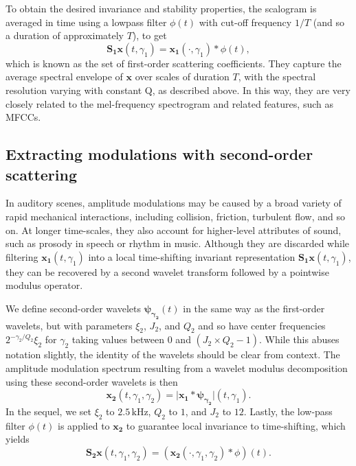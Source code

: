 \documentclass[journal]{IEEEtran}
\begin{document}
To obtain the desired invariance and stability properties, the scalogram is averaged in time using a lowpass filter $\phi(t)$ with cut-off frequency $1/T$ (and so a duration of approximately $T$), to get
\begin{equation}
\mathbf{S_1}\boldsymbol{x}(t, \gamma_1) = \boldsymbol{x_1}(\cdot, \gamma_1) \ast \phi(t),
\end{equation}
which is known as the set of first-order scattering coefficients. They capture the average spectral envelope of $\boldsymbol{x}$ over scales of duration $T$, with the spectral resolution varying with constant Q, as described above. In this way, they are very closely related to the mel-frequency spectrogram and related features, such as MFCCs.

\subsection{Extracting modulations with second-order scattering}
In auditory scenes, amplitude modulations may be caused by a broad variety of rapid mechanical interactions, including collision, friction, turbulent flow, and so on.
At longer time-scales, they also account for higher-level attributes of sound, such as prosody in speech or rhythm in music.
Although they are discarded while filtering $\boldsymbol{x_1}(t,\gamma_1)$ into a local time-shifting invariant representation $\mathbf{S_1}\boldsymbol{x}(t,\gamma_1)$, they can be recovered by a second wavelet transform followed by a pointwise modulus operator.

We define second-order wavelets $\boldsymbol{\psi_{\gamma_2}}(t)$ in the same way as the first-order wavelets, but with parameters $\xi_2$, $J_2$, and $Q_2$ and so have center frequencies $2^{-\gamma_2/Q_2}\xi_2$ for $\gamma_2$ taking values between $0$ and $(J_2 \times Q_2 - 1)$. While this abuses notation slightly, the identity of the wavelets should be clear from context.
The amplitude modulation spectrum resulting from a wavelet modulus decomposition using these second-order wavelets is then
\begin{equation}
\boldsymbol{x_2}(t,\gamma_1,\gamma_2) =
\vert \boldsymbol{x_1} \ast \boldsymbol{\psi_{\gamma_2}} \vert(t,\gamma_1).
\end{equation}
In the sequel, we set $\xi_2$ to $2.5\,\mathrm{kHz}$, $Q_2$ to $1$, and $J_2$ to $12$. Lastly, the low-pass filter $\phi(t)$ is applied to $\boldsymbol{x_2}$ to guarantee local invariance to time-shifting, which yields
\begin{equation}
\mathbf{S_2}\boldsymbol{x}(t,\gamma_1,\gamma_2) =
(\boldsymbol{x_2}(\cdot,\gamma_1,\gamma_2) \ast \phi)(t).
\end{equation}
\end{document}
